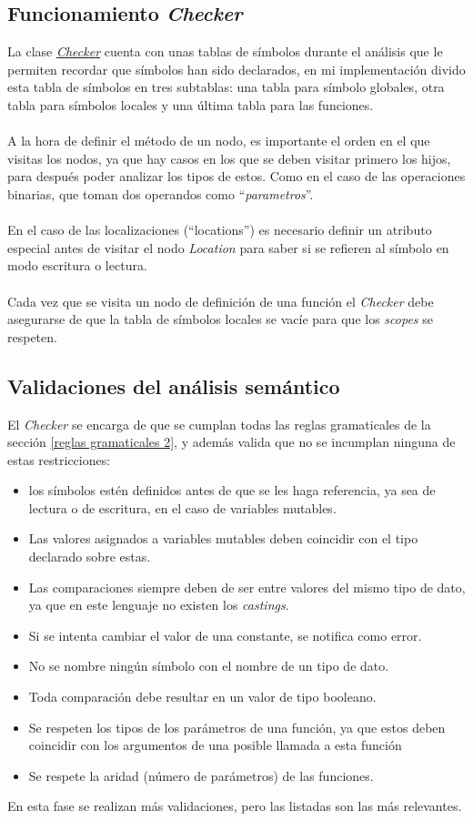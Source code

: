 \subsection{Funcionamiento \textit{Checker}}
La clase \href{https://github.com/domingoUnican/TFGPedroCastro/blob/main/code/compilerGoneFSR/gone/checker.py}{\textit{Checker}} cuenta con unas tablas de símbolos durante el análisis que le permiten recordar que símbolos han sido declarados, en mi implementación divido esta tabla de símbolos en tres subtablas: una tabla para símbolo globales, otra tabla para símbolos locales y una última tabla para las funciones. \\\\
A la hora de definir el método de un nodo, es importante el orden en el que visitas los nodos, ya que hay casos en los que se deben visitar primero los hijos, para después poder analizar los tipos de estos. Como en el caso de las operaciones binarias, que toman dos operandos como ``\textit{parametros}''. \\\\
En el caso de las localizaciones (``locations'') es necesario definir un atributo especial antes de visitar el nodo \textit{Location} para saber si se refieren al símbolo en modo escritura o lectura.\\\\
Cada vez que se visita un nodo de definición de una función el \textit{Checker} debe asegurarse de que la tabla de símbolos locales se vacíe para que los \textit{scopes} se respeten.
\subsection{Validaciones del análisis semántico}
El \textit{Checker} se encarga de que se cumplan todas las reglas gramaticales de la sección \ref{reglas gramaticales 2}, y además valida que no se incumplan ninguna de estas restricciones:
\begin{itemize}
    \item{ los símbolos estén definidos antes de que se les haga referencia, ya sea de lectura o de escritura, en el caso de variables mutables.}
    \item{Las valores asignados a variables mutables deben coincidir con el tipo declarado sobre estas.}
    \item{Las comparaciones siempre deben de ser entre valores del mismo tipo de dato, ya que en este lenguaje no existen los \textit{castings}.}
    \item{Si se intenta cambiar el valor de una constante, se notifica como error.}
    \item{No se nombre ningún símbolo con el nombre de un tipo de dato.}
    \item{Toda comparación debe resultar en un valor de tipo booleano.}
    \item{Se respeten los tipos de los parámetros de una función, ya que estos deben coincidir con los argumentos de una posible llamada a esta función}
    \item{Se respete la aridad (número de parámetros) de las funciones.}\\
\end{itemize}
En esta fase se realizan más validaciones, pero las listadas son las más relevantes.

